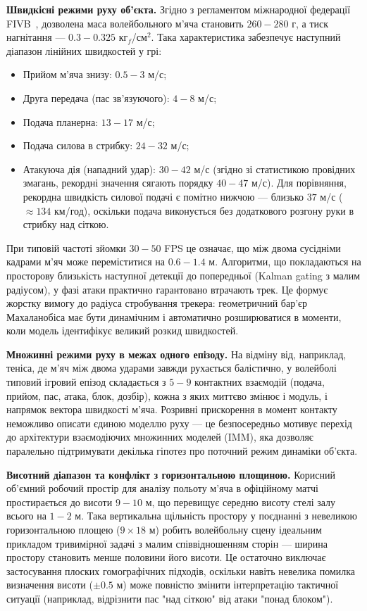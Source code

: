 \textbf{Швидкісні режими руху об'єкта.} Згідно з регламентом міжнародної федерації
FIVB~\cite{fivb_rules}, дозволена маса волейбольного м'яча становить $260-280$ г, а тиск нагнітання ---
$0.3-0.325$ кг$_{f}$/см$^2$. Така характеристика забезпечує наступний діапазон лінійних швидкостей у грі:
\begin{itemize}
    \item Прийом м'яча знизу: $0.5-3$ м/с;
    \item Друга передача (пас зв'язуючого): $4-8$ м/с;
    \item Подача планерна: $13-17$ м/с;
    \item Подача силова в стрибку: $24-32$ м/с;
    \item Атакуюча дія (нападний удар): $30-42$ м/с (згідно зі статистикою провідних
    змагань, рекордні значення сягають порядку $40-47$ м/с). Для порівняння, рекордна
    швидкість силової подачі є помітно нижчою --- близько $37$ м/с ($\approx 134$ км/год),
    оскільки подача виконується без додаткового розгону руки в стрибку над сіткою.
\end{itemize}

При типовій частоті зйомки $30-50$ FPS це означає, що між двома сусідніми кадрами м'яч
може переміститися на $0.6-1.4$ м. Алгоритми, що покладаються на просторову близькість
наступної детекції до попередньої (Kalman gating з малим радіусом), у фазі атаки практично
гарантовано втрачають трек. Це формує жорстку вимогу до радіуса стробування трекера:
геометричний бар'єр Махаланобіса має бути динамічним і автоматично розширюватися в моменти,
коли модель ідентифікує великий розкид швидкостей.

\textbf{Множинні режими руху в межах одного епізоду.} На відміну від, наприклад, теніса,
де м'яч між двома ударами завжди рухається балістично, у волейболі типовий ігровий епізод
складається з $5-9$ контактних взаємодій (подача, прийом, пас, атака, блок, дозбір), кожна
з яких миттєво змінює і модуль, і напрямок вектора швидкості м'яча. Розривні
прискорення в момент контакту неможливо описати єдиною моделлю руху ---
це безпосередньо мотивує перехід до архітектури взаємодіючих множинних моделей
(\gls{IMM}), яка дозволяє паралельно підтримувати декілька гіпотез про поточний
режим динаміки об'єкта.

\textbf{Висотний діапазон та конфлікт з горизонтальною площиною.} Корисний об'ємний робочий
простір для аналізу польоту м'яча в офіційному матчі простирається до висоти $9-10$ м, що
перевищує середню висоту стелі залу всього на $1-2$ м. Така вертикальна щільність простору
у поєднанні з невеликою горизонтальною площею ($9 \times 18$ м) робить волейбольну сцену
ідеальним прикладом тривимірної задачі з малим співвідношенням сторін --- ширина простору
становить менше половини його висоти. Це остаточно виключає застосування плоских
гомографічних підходів, оскільки навіть невелика помилка визначення висоти ($\pm 0.5$ м)
може повністю змінити інтерпретацію тактичної ситуації (наприклад, відрізнити пас "над
сіткою" від атаки "понад блоком").

